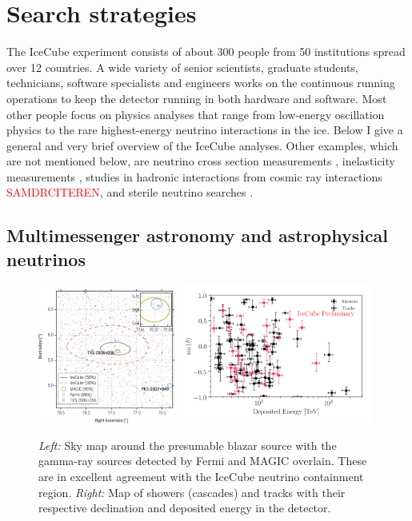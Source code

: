 \iffalse
\section{Search strategies}
The IceCube experiment consists of about 300 people from 50 institutions spread over 12 countries. A wide variety of senior scientists, graduate students, technicians, software specialists and engineers works on the continuous running operations to keep the detector running in both hardware and software. Most other people focus on physics analyses that range from low-energy oscillation physics to the rare highest-energy neutrino interactions in the ice. Below I give a general and very brief overview of the IceCube analyses. Other examples, which are not mentioned below, are neutrino cross section measurements \cite{Aartsen:2017kpd}, inelasticity measurements \cite{Aartsen:2018vez}, studies in hadronic interactions from cosmic ray interactions \textcolor{red}{SAMDRCITEREN}, and sterile neutrino searches \cite{TheIceCube:2016oqi}.

\subsection{Multimessenger astronomy and astrophysical neutrinos}
\label{subsec:multimessenger}
\begin{figure}[t]
\centering
\includegraphics[width=0.4\textwidth]{chapter5/img/blazar.jpg}
\includegraphics[width=0.57\textwidth]{chapter5/img/highenergyevents.png}
\caption{\textit{Left:} Sky map around the presumable blazar source with the gamma-ray sources detected by Fermi and MAGIC overlain. These are in excellent agreement with the IceCube neutrino containment region. \textit{Right:} Map of showers (cascades) and tracks with their respective declination and deposited energy in the detector.}
\label{fig:blazarandastro}
\end{figure}

